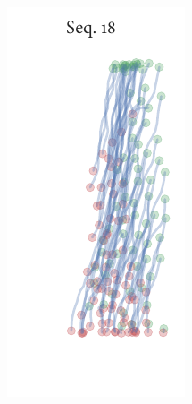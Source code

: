 \begin{figure}[h]
\begin{subfigure}[t]{0.5\textwidth}
	\end{subfigure}%
	\begin{subfigure}[t]{0.5\textwidth}
		\centering
		\includegraphics{sequence18.pdf}
	\end{subfigure}
\end{figure}

